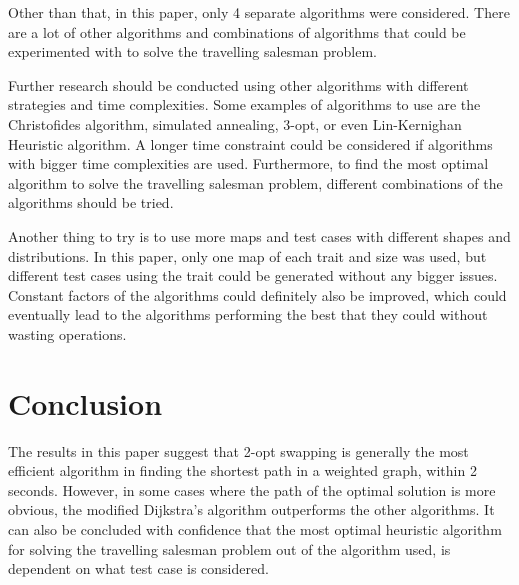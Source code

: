 \documentclass{article}
\begin{document}
\noindent
Other than that, in this paper, only 4 separate algorithms were considered. There are a lot of other algorithms and combinations of algorithms that could be experimented with to solve the travelling salesman problem.

\noindent
Further research should be conducted using other algorithms with different strategies and time complexities. Some examples of algorithms to use are the Christofides algorithm, simulated annealing, 3-opt, or even Lin-Kernighan Heuristic algorithm. A longer time constraint could be considered if algorithms with bigger time complexities are used. Furthermore, to find the most optimal algorithm to solve the travelling salesman problem, different combinations of the algorithms should be tried. 

\noindent
Another thing to try is to use more maps and test cases with different shapes and distributions. In this paper, only one map of each trait and size was used, but different test cases using the trait could be generated without any bigger issues. Constant factors of the algorithms could definitely also be improved, which could eventually lead to the algorithms performing the best that they could without wasting operations.

\newpage
\section{Conclusion}\label{sec5}
The results in this paper suggest that 2-opt swapping is generally the most efficient algorithm in finding the shortest path in a weighted graph, within 2 seconds. However, in some cases where the path of the optimal solution is more obvious, the modified Dijkstra's algorithm outperforms the other algorithms. It can also be concluded with confidence that the most optimal heuristic algorithm for solving the travelling salesman problem out of the algorithm used, is dependent on what test case is considered.


\newpage

 \label{sec6}


\newpage
\end{document}

